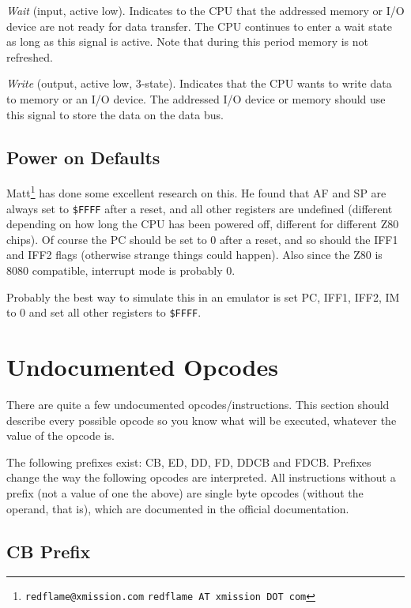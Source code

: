 \documentclass[12pt,twoside,openright,a4paper]{book}
\makeatletter
\newcommand*{\PRINTED}{}	%
\newcommand{\email}[3]{
	\ifdefined\PRINTED
		{\tt #1@#2.#3}
	\else
		{\tt #1 AT #2 DOT #3}
	\fi
}
\makeatother
\begin{document}
\begin{description}[leftmargin=1.5em]
	\item[$\mathtt{\overline{WAIT}}$]
	{\em Wait} (input, active low). Indicates to the CPU that the addressed memory or I/O device are not ready for data transfer. The CPU continues to enter a wait state as long as this signal is active. Note that during this period memory is not refreshed.

	\item[$\mathtt{\overline{WR}}$]
	{\em Write} (output, active low, 3-state). Indicates that the CPU wants to write data to memory or an I/O device. The addressed I/O device or memory should use this signal to store the data on the data bus.

\end{description}


\subsection{Power on Defaults}
\label{pon}

Matt\footnote{\email{redflame}{xmission}{com}} has done some excellent research on this. He found that AF and SP are always set to {\tt \$FFFF} after a reset, and all other registers are undefined (different depending on how long the CPU has been powered off, different for different Z80 chips). Of course the PC should be set to 0 after a reset, and so should the IFF1 and IFF2 flags (otherwise strange things could happen). Also since the Z80 is 8080 compatible, interrupt mode is probably 0.

Probably the best way to simulate this in an emulator is set PC, IFF1, IFF2, IM to 0 and set all other registers to {\tt \$FFFF}.


\section{Undocumented Opcodes}

There are quite a few undocumented opcodes/instructions. This section should describe every possible opcode so you know what will be executed, whatever the value of the opcode is.

The following prefixes exist: CB, ED, DD, FD, DDCB and FDCB. Prefixes change the way the following opcodes are interpreted. All instructions without a prefix (not a value of one the above) are single byte opcodes (without the operand, that is), which are documented in the official documentation.


\subsection{CB Prefix \cite{gerton}}
\label{prefix_cb}
\end{document}
